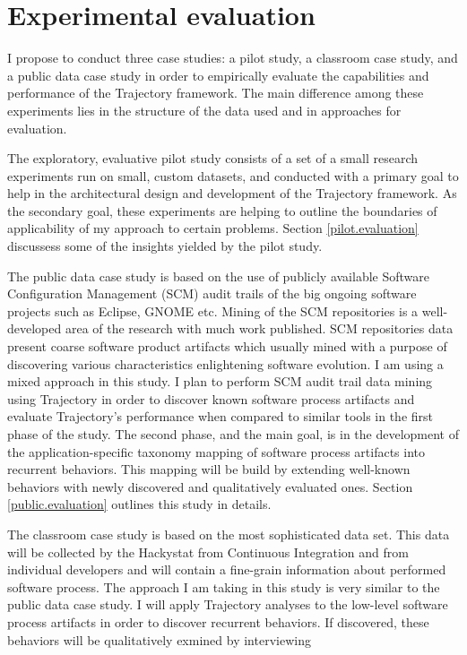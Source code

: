 \chapter{Experimental evaluation} \label{experiments}
I propose to conduct three case studies: a pilot study, a classroom case study, and a public data case study in order to empirically evaluate the capabilities and performance of the Trajectory framework. The main difference among these experiments lies in the structure of the data used and in approaches for evaluation. 

The exploratory, evaluative pilot study consists of a set of a small research experiments run on small, custom datasets, and conducted with a primary goal to help in the architectural design and development of the Trajectory framework. As the secondary goal, these experiments are helping to outline the boundaries of applicability of my approach to certain problems. Section \ref{pilot.evaluation} discussess some of the insights yielded by the pilot study.

The public data case study is based on the use of publicly available Software Configuration Management (SCM) audit trails of the big ongoing software projects such as Eclipse, GNOME etc. Mining of the SCM repositories is a well-developed area of the research with much work published. SCM repositories data present coarse software product artifacts which usually mined with a purpose of discovering various characteristics enlightening software evolution. I am using a mixed approach in this study. I plan to perform SCM audit trail data mining using Trajectory in order to discover known software process artifacts and evaluate Trajectory's performance when compared to similar tools in the first phase of the study. The second phase, and the main goal, is in the development of the application-specific taxonomy mapping of software process artifacts into recurrent behaviors. This mapping will be build by extending well-known behaviors with newly discovered and qualitatively evaluated ones. Section \ref{public.evaluation} outlines this study in details.

The classroom case study is based on the most sophisticated data set. This data will be collected by the Hackystat from Continuous Integration and from individual developers and will contain a fine-grain information about performed software process. The approach I am taking in this study is very similar to the public data case study. I will apply Trajectory analyses to the low-level software process artifacts in order to discover recurrent behaviors. If discovered, these behaviors will be qualitatively exmined by interviewing 


